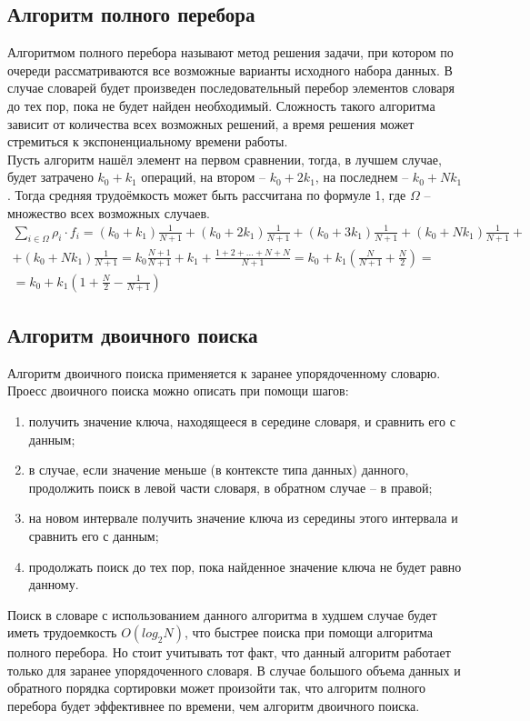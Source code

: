 \documentclass[a4paper, 12pt]{article}
\begin{document}
	\subsection{Алгоритм полного перебора}
	\hspace*{5mm} Алгоритмом полного перебора называют метод решения задачи, при котором по очереди рассматриваются все возможные варианты исходного набора данных. В случае словарей будет произведен последовательный перебор элементов словаря до тех пор, пока не будет найден необходимый. Сложность такого алгоритма зависит от количества всех возможных решений, а время решения может стремиться к экспоненциальному времени работы.
	\\ \hspace*{5mm} Пусть алгоритм нашёл элемент на первом сравнении, тогда, в лучшем случае, будет затрачено $k_0+k_1$ операций, на втором – $k_0 + 2k_1$, на последнем – $k_0+Nk_1$. Тогда средняя трудоёмкость может быть рассчитана по формуле 1, где $\Omega$ – множество всех возможных случаев.
	\begin{multline}
		\sum\limits_{i\in\Omega} \rho_i \cdot f_i = (k_0 + k_1)\frac{1}{N + 1} + (k_0 + 2k_1)\frac{1}{N + 1} +  (k_0 + 3k_1)\frac{1}{N + 1} + (k_0 + Nk_1)\frac{1}{N + 1} +\\+ (k_0 + Nk_1)\frac{1}{N + 1} = 
		k_0\frac{N + 1}{N + 1} + k_1 + \frac{1 + 2 + \dots + N + N}{N + 1} = k_0 + k_1(\frac{N}{N + 1} + \frac{N}{2}) = \\ = k_0 + k_1(1 + \frac{N}{2} - \frac{1}{N + 1})
	\end{multline}
	\subsection{Алгоритм двоичного поиска}
	\hspace*{5mm} Алгоритм двоичного поиска применяется к заранее упорядоченному словарю.\cite{bin} Проесс двоичного поиска можно описать при помощи шагов:
	\begin{enumerate}
		\item получить значение ключа, находящееся в середине словаря, и сравнить его с данным;
		\item в случае, если значение меньше (в контексте типа данных) данного, продолжить поиск в левой части словаря, в обратном случае – в правой;
		\item на новом интервале получить значение ключа из середины этого интервала и сравнить его с данным;
		\item продолжать поиск до тех пор, пока найденное значение ключа не будет равно данному.
	\end{enumerate}
	\hspace*{5mm}Поиск в словаре с использованием данного алгоритма в худшем случае будет иметь трудоемкость $O(log_2N)$, что быстрее поиска при помощи алгоритма полного перебора. Но стоит учитывать тот факт, что данный
	алгоритм работает только для заранее упорядоченного словаря. В случае большого объема данных и обратного порядка сортировки может произойти так, что алгоритм полного перебора будет эффективнее по времени, чем
	алгоритм двоичного поиска.
\end{document}
